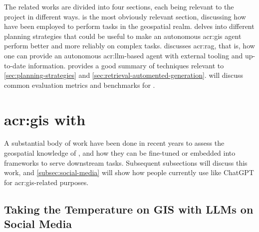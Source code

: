 The related works are divided into four sections, each being relevant to the project in different ways.  is the most obviously relevant section, discussing how  have been employed to perform tasks in the geospatial realm.  delves into different planning strategies that could be useful to make an autonomous \acrshort{acr:gis} agent perform better and more reliably on complex tasks.  discusses \gls{acr:rag}, that is, how one can provide an autonomous \acrshort{acr:llm}-based agent with external tooling and up-to-date information. \cite{wengLLMPoweredAutonomous2023} provides a good summary of techniques relevant to \autoref{sec:planning-strategies} and \autoref{sec:retrieval-automented-generation}.  will discuss common evaluation metrics and benchmarks for .



\section[GIS with LLMs]{\acrshort{acr:gis} with }\label{sec:gis-with-llms}

A substantial body of work have been done in recent years to assess the geospatial knowledge of , and how they can be fine-tuned or embedded into frameworks to serve downstream tasks. Subsequent subsections will discuss this work, and \autoref{subsec:social-media} will show how people currently use  like ChatGPT for \acrshort{acr:gis}-related purposes.

\subsection{Taking the Temperature on GIS with LLMs on Social Media}\label{subsec:social-media}

